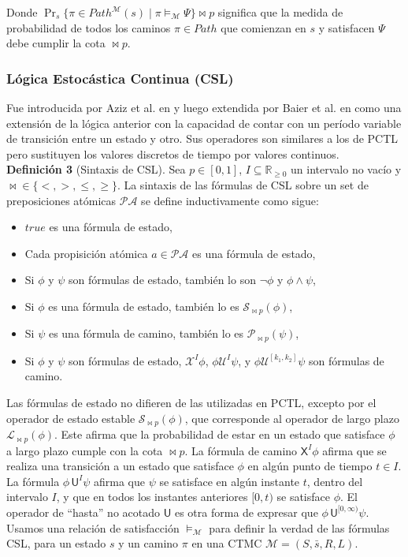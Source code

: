 \documentclass[runningheads]{llncs}
\begin{document}
Donde $\Pr_s\{\pi \in Path^\mathcal{M}(s) \mid \pi \models_\mathcal{M} \Psi\} \bowtie p$ significa que la medida de probabilidad de todos los caminos $\pi \in Path$ que comienzan en $s$ y satisfacen $\Psi$ debe cumplir la cota $\bowtie p$.


\subsubsection{Lógica Estocástica Continua (CSL)}

Fue introducida por Aziz et al. en \cite{ASSB96} y luego extendida por Baier et al. en \cite{BKH99} como una extensión de la lógica anterior con la capacidad de contar con un período variable de transición entre un estado y otro. Sus operadores son similares a los de PCTL pero sustituyen los valores discretos de tiempo por valores continuos.\\

\textbf{Definición 3} (Sintaxis de CSL). Sea $p\in[0,1]$, $I\subseteq\mathbb{R}_{\ge0}$ un intervalo no vacío y $\bowtie\in\{<,>,\le,\ge\}$. La sintaxis de las fórmulas de CSL sobre un set de preposiciones atómicas $\mathcal{PA}$ se define inductivamente como sigue:
\begin{itemize}
    \item $true$ es una fórmula de estado,
    \item Cada propisición atómica $a\in\mathcal{PA}$ es una fórmula de estado,
    \item Si $\phi$ y $\psi$ son fórmulas de estado, también lo son $\neg\phi$ y $\phi\land\psi$,
    \item Si $\phi$ es una fórmula de estado, también lo es $\mathcal{S}_{\bowtie p}(\phi)$,
    \item Si $\psi$ es una fórmula de camino, también lo es $\mathcal{P}_{\bowtie p}(\psi)$,
    \item Si $\phi$ y $\psi$ son fórmulas de estado, $\mathcal{X}^I\phi$, $\phi\mathcal{U}^I\psi$, y $\phi\mathcal{U}^{[k_1,k_2]}\psi$ son fórmulas de camino.
\end{itemize}\par

Las fórmulas de estado no difieren de las utilizadas en PCTL, excepto por el operador de estado estable $\mathcal{S}_{\bowtie p}(\phi)$, que corresponde al operador de largo plazo $\mathcal{L}_{\bowtie p}(\phi)$. Este afirma que la probabilidad de estar en un estado que satisface $\phi$ a largo plazo cumple con la cota $\bowtie p$. La fórmula de camino $\mathsf{X}^I \phi$ afirma que se realiza una transición a un estado que satisface $\phi$ en algún punto de tiempo $t \in I$. La fórmula $\phi \, \mathsf{U}^I \psi$ afirma que $\psi$ se satisface en algún instante $t$, dentro del intervalo $I$, y que en todos los instantes anteriores $[0, t)$ se satisface $\phi$. El operador de ``hasta'' no acotado $\mathsf{U}$ es otra forma de expresar que $\phi \, \mathsf{U}^{[0,\infty)} \psi$. Usamos una relación de satisfacción $\models_\mathcal{M}$ para definir la verdad de las fórmulas CSL, para un estado $s$ y un camino $\pi$ en una CTMC $\mathcal{M} = (S, \bar{s}, R, L)$.\\
\end{document}
